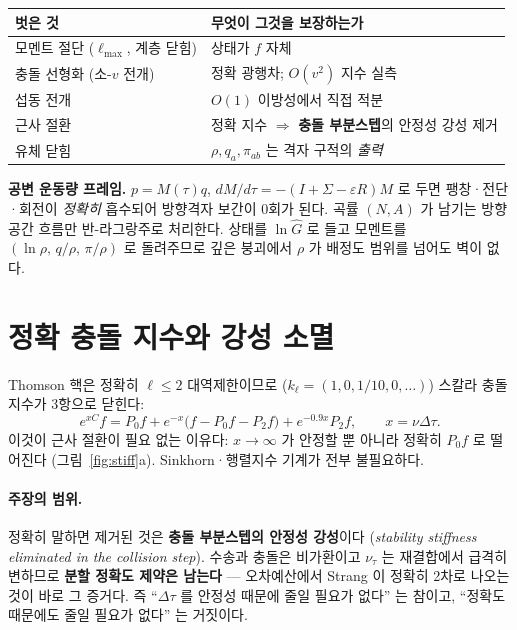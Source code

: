 \documentclass[11pt,a4paper]{article}
\newcommand{\Ghat}{\hat{G}}
\begin{document}
\begin{center}\small
\begin{tabular}{@{}ll@{}}
\toprule
\textbf{벗은 것} & \textbf{무엇이 그것을 보장하는가} \\
\midrule
모멘트 절단 ($\ell_{\max}$, 계층 닫힘) & 상태가 $f$ 자체 \\
충돌 선형화 (소-$v$ 전개) & 정확 광행차; $O(v^2)$ 지수 실측 \\
섭동 전개 & $O(1)$ 이방성에서 직접 적분 \\
근사 절환 & 정확 지수 $\Rightarrow$ \textbf{충돌 부분스텝}의 안정성 강성 제거 \\
유체 닫힘 & $\rho,q_a,\pi_{ab}$ 는 격자 구적의 \emph{출력} \\
\bottomrule
\end{tabular}
\end{center}

\medskip\noindent
\textbf{공변 운동량 프레임.} $p = M(\tau)q$, $dM/d\tau = -(I+\Sigma-\varepsilon R)M$
로 두면 팽창·전단·회전이 \emph{정확히} 흡수되어 방향격자 보간이 0회가 된다.
곡률 $(N,A)$ 가 남기는 방향공간 흐름만 반-라그랑주로 처리한다.
상태를 $\ln\Ghat$ 로 들고 모멘트를 $(\ln\rho,\,q/\rho,\,\pi/\rho)$ 로 돌려주므로
깊은 붕괴에서 $\rho$ 가 배정도 범위를 넘어도 벽이 없다.

\section{정확 충돌 지수와 강성 소멸}

Thomson 핵은 정확히 $\ell\le2$ 대역제한이므로 ($k_\ell=(1,0,1/10,0,\dots)$)
스칼라 충돌 지수가 3항으로 닫힌다:
\begin{equation}
e^{xC}f = P_0 f + e^{-x}\bigl(f-P_0f-P_2f\bigr) + e^{-0.9x}P_2 f,
\qquad x=\nu\Delta\tau .
\end{equation}
이것이 근사 절환이 필요 없는 이유다: $x\to\infty$ 가 안정할 뿐 아니라 정확히
$P_0 f$ 로 떨어진다 (그림~\ref{fig:stiff}a). Sinkhorn·행렬지수 기계가 전부 불필요하다.

\paragraph{주장의 범위.} 정확히 말하면 제거된 것은 \textbf{충돌 부분스텝의 안정성
강성}이다 (\emph{stability stiffness eliminated in the collision step}).  수송과
충돌은 비가환이고 $\nu_\tau$ 는 재결합에서 급격히 변하므로 \textbf{분할 정확도
제약은 남는다} --- 오차예산에서 Strang 이 정확히 2차로 나오는 것이 바로 그
증거다.  즉 ``$\Delta\tau$ 를 안정성 때문에 줄일 필요가 없다'' 는 참이고,
``정확도 때문에도 줄일 필요가 없다'' 는 거짓이다.
\end{document}

